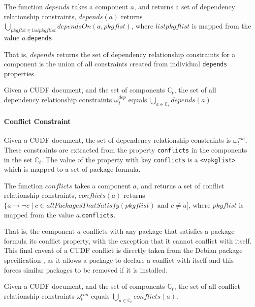 \begin{defs}
The function $depends$ takes a component $a$, and returns a set of dependency relationship constraints,
$depends(a)$ returns $\bigcup \limits_{pkgflst \in listpkgflist} dependsOn(a,pkgflst)$, where $listpkgflist$ is mapped from the value $a$.\texttt{depends}.
\end{defs}
That is, $depends$ returns the set of dependency relationship constraints for a component is the union of all constraints created from individual \verb+depends+ properties.

\begin{defs}
Given a CUDF document, and the set of components $\mathbb{C}_t$,
the set of all dependency relationship constraints $\omega_t^{dep}$ equals $\bigcup \limits_{a \in \mathbb{C}_t} depends(a)$.
\end{defs}

\paragraph{Conflict Constraint}
Given a CUDF document, the set of dependency relationship constraints is $\omega_t^{con}$.
These constraints are extracted from the property \texttt{conflicts} in the components in the set $\mathbb{C}_t$.
The value of the property with key \texttt{conflicts} is a \texttt{<vpkglist>} which is mapped to a set of package formula.

\begin{defs}
The function $conflicts$ takes a component $a$, and returns a set of conflict relationship constraints,
$conflicts(a)$ returns $\{a \rightarrow \neg c \mid c \in allPackagesThatSatisfy(pkgflist) \mbox { and } c \not = a]$, where $pkgflist$ is mapped from the value $a$.\texttt{conflicts}.
\end{defs}
That is, the component $a$ conflicts with any package that satisfies a package formula its conflict property,
with the exception that it cannot conflict with itself.
This final caveat of a CUDF conflict is directly taken from the Debian package specification \citep{Barth2005}, 
as it allows a package to declare a conflict with itself and this forces similar packages to be removed if it is installed.  

\begin{defs}
Given a CUDF document, and the set of components $\mathbb{C}_t$,
the set of all conflict relationship constraints $\omega_t^{con}$ equals $\bigcup \limits_{a\in \mathbb{C}_t} conflicts(a)$.
\end{defs} 

